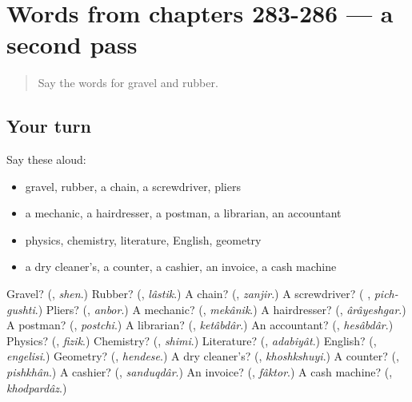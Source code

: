 \section[(dialogue)]{Words from chapters 283-286 — a second pass}

\label{lesson:FA-R286-second-pass-words-from-chapters-283-286}



\begin{quote}
Say the words for gravel and rubber.
\end{quote}

\subsection*{Your turn}
Say these aloud:

\begin{itemize}
\raggedright
  \item gravel, rubber, a chain, a screwdriver, pliers
  \item a mechanic, a hairdresser, a postman, a librarian, an accountant
  \item physics, chemistry, literature, English, geometry
  \item a dry cleaner's, a counter, a cashier, an invoice, a cash machine
\end{itemize}

\begin{tcolorbox}[breakable,colback=teal!4,colframe=teal!35!black,title={Before you move on}]
Gravel? (\textbf{}, \emph{shen}.) Rubber? (\textbf{}, \emph{lâstik}.) A chain? (\textbf{}, \emph{zanjir}.) A screwdriver? (\textbf{ }, \emph{pich-gushti}.) Pliers? (\textbf{}, \emph{anbor}.) A mechanic? (\textbf{}, \emph{mekânik}.) A hairdresser? (\textbf{}, \emph{ârâyeshgar}.) A postman? (\textbf{}, \emph{postchi}.) A librarian? (\textbf{}, \emph{ketâbdâr}.) An accountant? (\textbf{}, \emph{hesâbdâr}.) Physics? (\textbf{}, \emph{fizik}.) Chemistry? (\textbf{}, \emph{shimi}.) Literature? (\textbf{}, \emph{adabiyât}.) English? (\textbf{}, \emph{engelisi}.) Geometry? (\textbf{}, \emph{hendese}.) A dry cleaner's? (\textbf{}, \emph{khoshkshuyi}.) A counter? (\textbf{}, \emph{pishkhân}.) A cashier? (\textbf{}, \emph{sanduqdâr}.) An invoice? (\textbf{}, \emph{fâktor}.) A cash machine? (\textbf{}, \emph{khodpardâz}.)
\end{tcolorbox}
